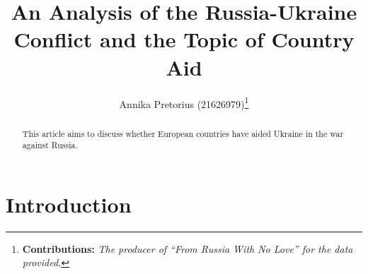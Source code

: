 \documentclass[12pt,preprint, authoryear]{elsarticle}
\numberwithin{equation}{section}
\numberwithin{figure}{section}
\numberwithin{table}{section}
\let\rmarkdownfootnote\footnote%
\def\footnote{\protect\rmarkdownfootnote}
\begin{document}
\begin{frontmatter}  %

\title{An Analysis of the Russia-Ukraine Conflict and the Topic of
Country Aid}





\author[Add1]{Annika Pretorius (21626979)\footnote{\textbf{Contributions:}
  \newline \emph{The producer of ``From Russia With No Love'' for the
  data provided.}}}
\ead{}





\address[Add1]{Australian News Presenter}


\begin{abstract}
\small{
This article aims to discuss whether European countries have aided
Ukraine in the war against Russia.
}
\end{abstract}

\vspace{1cm}





\vspace{0.5cm}

\end{frontmatter}



\pagestyle{fancy}
\chead{}
\rhead{}
\lfoot{}
\lhead{}
\cfoot{}


\headsep 35pt %




\hypertarget{introduction}{%
\section{Introduction}\label{introduction}}
\end{document}
